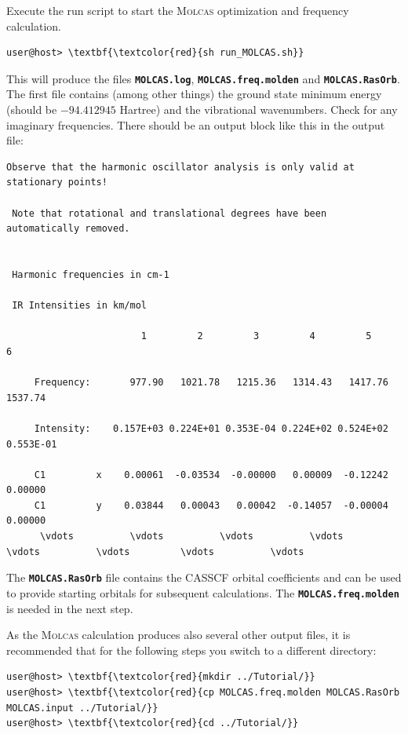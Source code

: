 \documentclass[a4paper,11pt,DIV=15,openany]{scrbook}
\newcommand{\ttt}[1]{\textbf{\texttt{#1}}}
\begin{document}
\normalsize

Execute the run script to start the \textsc{Molcas} optimization and frequency calculation.
\begin{Verbatim}[commandchars=\\\{\}]
user@host> \textbf{\textcolor{red}{sh run_MOLCAS.sh}}
\end{Verbatim}
This will produce the files \ttt{MOLCAS.log}, \ttt{MOLCAS.freq.molden} and \ttt{MOLCAS.RasOrb}. 
The first file contains (among other things) the ground state minimum energy (should be $-94.412945$ Hartree) and the vibrational wavenumbers. 
Check for any imaginary frequencies. 
There should be an output block like this in the output file:
\begin{oframed}
\footnotesize\begin{Verbatim}[commandchars=\\\{\}]
 Observe that the harmonic oscillator analysis is only valid at stationary points!

 Note that rotational and translational degrees have been automatically removed.


 Harmonic frequencies in cm-1

 IR Intensities in km/mol

                        1         2         3         4         5         6
 
     Frequency:       977.90   1021.78   1215.36   1314.43   1417.76   1537.74
 
     Intensity:    0.157E+03 0.224E+01 0.353E-04 0.224E+02 0.524E+02 0.553E-01
 
     C1         x    0.00061  -0.03534  -0.00000   0.00009  -0.12242   0.00000
     C1         y    0.03844   0.00043   0.00042  -0.14057  -0.00004   0.00000
      \vdots          \vdots          \vdots          \vdots         \vdots          \vdots         \vdots          \vdots
\end{Verbatim}
\end{oframed}

\normalsize
The \ttt{MOLCAS.RasOrb} file contains the CASSCF orbital coefficients and can be used to provide starting orbitals for subsequent calculations. 
The \ttt{MOLCAS.freq.molden} is needed in the next step.

As the \textsc{Molcas} calculation produces also several other output files, it is recommended that for the following steps you switch to a different directory:
\begin{Verbatim}[commandchars=\\\{\}]
user@host> \textbf{\textcolor{red}{mkdir ../Tutorial/}}
user@host> \textbf{\textcolor{red}{cp MOLCAS.freq.molden MOLCAS.RasOrb MOLCAS.input ../Tutorial/}}
user@host> \textbf{\textcolor{red}{cd ../Tutorial/}}
\end{Verbatim}
\end{document}
